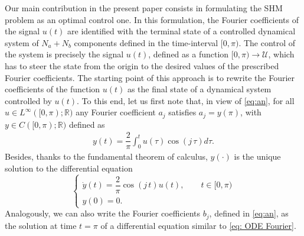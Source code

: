 \documentclass[twocolumn]{autart}    %
\begin{document}
Our main contribution in the present paper consists in formulating the SHM problem as an optimal control one. In this formulation, the Fourier coefficients of the signal $u(t)$ are identified with the terminal state of a controlled dynamical system of $N_a+N_b$ components defined in the time-interval $[0,\pi)$.  The control of the system is precisely the signal $u(t)$, defined as a function $[0,\pi)\to \mathcal{U}$, which has to steer the state from the origin to the desired values of the prescribed Fourier coefficients. The starting point of this approach is to rewrite the Fourier coefficients of the function $u(t)$ as the final state of a dynamical system controlled by $u(t)$. To this end, let us first note that, in view of \eqref{eq:an}, for all $u\in L^\infty ([0,\pi);\mathbb{R})$ any Fourier coefficient $a_j$ satisfies $a_j = y(\pi)$, with $y\in C([0,\pi);\mathbb{R})$ defined as
\begin{align*}
	y(t) = \dfrac{2}{\pi} \int_0^t u(\tau) \cos(j\, \tau) d\tau.
\end{align*}
Besides, thanks to the fundamental theorem of calculus, $y(\cdot)$ is the unique solution to the differential equation
\begin{equation}\label{eq: ODE Fourier}
	\begin{cases}
		\dot{y} (t) = \dfrac{2}{\pi} \cos(j\, t) u(t), \qquad  t\in [0,\pi)
		\\[5pt]
		y(0) = 0.
	\end{cases}
\end{equation}
Analogously, we can also write the Fourier coefficients $b_j$, defined in \eqref{eq:an}, as the solution at time $t=\pi$ of a differential equation similar to \eqref{eq: ODE Fourier}.
\end{document}
